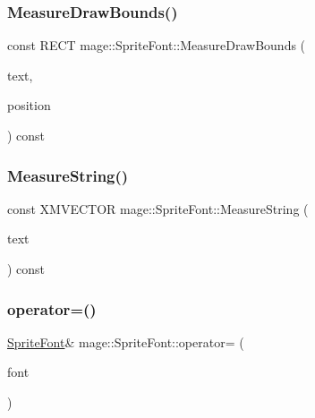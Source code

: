 \subsubsection{\texorpdfstring{Measure\+Draw\+Bounds()}{MeasureDrawBounds()}}
{\footnotesize\ttfamily const R\+E\+CT mage\+::\+Sprite\+Font\+::\+Measure\+Draw\+Bounds (\begin{DoxyParamCaption}\item[{const wchar\+\_\+t $\ast$}]{text,  }\item[{const X\+M\+F\+L\+O\+A\+T2 \&}]{position }\end{DoxyParamCaption}) const}

\hypertarget{classmage_1_1_sprite_font_ac4bb785adb3b2c41734523bf9af36723}{}\label{classmage_1_1_sprite_font_ac4bb785adb3b2c41734523bf9af36723} 
\subsubsection{\texorpdfstring{Measure\+String()}{MeasureString()}}
{\footnotesize\ttfamily const X\+M\+V\+E\+C\+T\+OR mage\+::\+Sprite\+Font\+::\+Measure\+String (\begin{DoxyParamCaption}\item[{const wchar\+\_\+t $\ast$}]{text }\end{DoxyParamCaption}) const}

\hypertarget{classmage_1_1_sprite_font_a3f95359a336adc87088eefe3103a770b}{}\label{classmage_1_1_sprite_font_a3f95359a336adc87088eefe3103a770b} 
\subsubsection{\texorpdfstring{operator=()}{operator=()}\hspace{0.1cm}{\footnotesize\ttfamily [1/2]}}
{\footnotesize\ttfamily \hyperlink{classmage_1_1_sprite_font}{Sprite\+Font}\& mage\+::\+Sprite\+Font\+::operator= (\begin{DoxyParamCaption}\item[{const \hyperlink{classmage_1_1_sprite_font}{Sprite\+Font} \&}]{font }\end{DoxyParamCaption})\hspace{0.3cm}{\ttfamily [delete]}}

